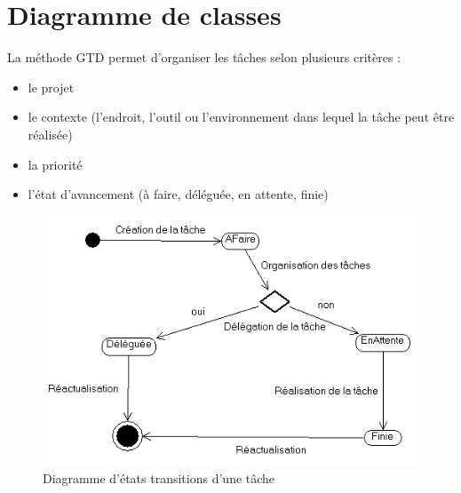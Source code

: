 \chapter{Diagramme de classes}
\cfoot{}
\rfoot{}

La méthode GTD permet d'organiser les tâches selon plusieurs critères :\\

\begin{itemize}
\item le projet
\item le contexte (l’endroit, l’outil ou l’environnement dans lequel la tâche peut être réalisée)
\item la priorité
\item l'état d'avancement (à faire, déléguée, en attente, finie)
\end{itemize}

\begin{figure}[H]
\begin{center}
\includegraphics[scale=0.8]{diagrams/etats_tache.png}
\caption{Diagramme d'états transitions d'une tâche}
\end{center}
\end{figure}


